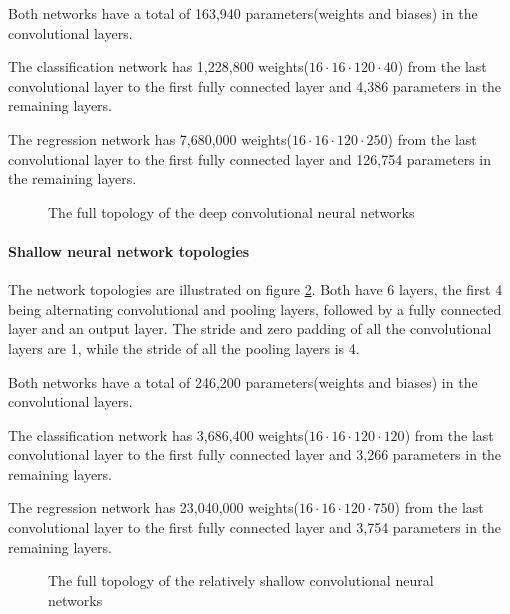Both networks have a total of 163,940 parameters(weights and biases) in the convolutional layers.

The classification network has 1,228,800 weights($16 \cdot 16 \cdot 120 \cdot 40$) from the last convolutional layer to the first fully connected layer and 4,386 parameters in the remaining layers.

The regression network has 7,680,000 weights($16 \cdot 16 \cdot 120 \cdot 250$) from the last convolutional layer to the first fully connected layer and 126,754 parameters in the remaining layers.

\begin{figure}[H]
	\vspace{-8mm}
	\begin{center}
	\begin{scriptsize}
		\sffamily
		\def\svgwidth{0.95\textwidth}
		
	\end{scriptsize}
	\end{center}
	\caption{The full topology of the deep convolutional neural networks}
	\label{fig:architectureOfDeepNet}
\end{figure}

\paragraph{Shallow neural network topologies}
The network topologies are illustrated on figure \ref{fig:architectureOfShallowNet}. Both have 6 layers, the first 4 being alternating convolutional and pooling layers, followed by a fully connected layer and an output layer.  The stride and zero padding of all the convolutional layers are 1, while the stride of all the pooling layers is 4.

Both networks have a total of 246,200 parameters(weights and biases) in the convolutional layers.

The classification network has 3,686,400 weights($16 \cdot 16 \cdot 120 \cdot 120$) from the last convolutional layer to the first fully connected layer and 3,266 parameters in the remaining layers.

The regression network has 23,040,000 weights($16 \cdot 16 \cdot 120 \cdot 750$) from the last convolutional layer to the first fully connected layer and 3,754 parameters in the remaining layers.

\begin{figure}[H]
	\begin{scriptsize}
		\sffamily
		\def\svgwidth{\textwidth}
		
	\end{scriptsize}
	\caption{The full topology of the relatively shallow convolutional neural networks}
	\label{fig:architectureOfShallowNet}
\end{figure}

